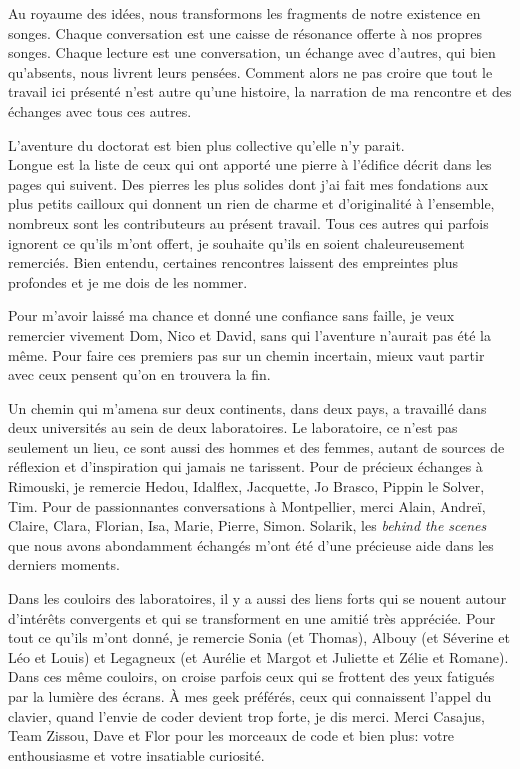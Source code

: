 Au royaume des idées, nous transformons les fragments de notre existence
en songes. Chaque conversation est une caisse de résonance offerte à nos
propres songes. Chaque lecture est une conversation, un échange avec
d'autres, qui bien qu'absents, nous livrent leurs pensées. Comment alors
ne pas croire que tout le travail ici présenté n'est autre qu'une
histoire, la narration de ma rencontre et des échanges avec tous ces
autres.

L'aventure du doctorat est bien plus collective qu'elle n'y parait.\\
Longue est la liste de ceux qui ont apporté une pierre à l'édifice
décrit dans les pages qui suivent. Des pierres les plus solides dont
j'ai fait mes fondations aux plus petits cailloux qui donnent un rien de
charme et d'originalité à l'ensemble, nombreux sont les contributeurs au
présent travail. Tous ces autres qui parfois ignorent ce qu'ils m'ont
offert, je souhaite qu'ils en soient chaleureusement remerciés. Bien
entendu, certaines rencontres laissent des empreintes plus profondes et
je me dois de les nommer.

Pour m'avoir laissé ma chance et donné une confiance sans faille, je
veux remercier vivement Dom, Nico et David, sans qui l'aventure n'aurait
pas été la même. Pour faire ces premiers pas sur un chemin incertain,
mieux vaut partir avec ceux pensent qu'on en trouvera la fin.

Un chemin qui m'amena sur deux continents, dans deux pays, a travaillé
dans deux universités au sein de deux laboratoires. Le laboratoire, ce
n'est pas seulement un lieu, ce sont aussi des hommes et des femmes,
autant de sources de réflexion et d'inspiration qui jamais ne tarissent.
Pour de précieux échanges à Rimouski, je remercie Hedou, Idalflex,
Jacquette, Jo Brasco, Pippin le Solver, Tim. Pour de passionnantes
conversations à Montpellier, merci Alain, Andreï, Claire, Clara,
Florian, Isa, Marie, Pierre, Simon. Solarik, les \emph{behind the
scenes} que nous avons abondamment échangés m'ont été d'une précieuse
aide dans les derniers moments.

Dans les couloirs des laboratoires, il y a aussi des liens forts qui se
nouent autour d'intérêts convergents et qui se transforment en une
amitié très appréciée. Pour tout ce qu'ils m'ont donné, je remercie
Sonia (et Thomas), Albouy (et Séverine et Léo et Louis) et Legagneux (et
Aurélie et Margot et Juliette et Zélie et Romane). Dans ces même
couloirs, on croise parfois ceux qui se frottent des yeux fatigués par
la lumière des écrans. À mes geek préférés, ceux qui connaissent l'appel
du clavier, quand l'envie de coder devient trop forte, je dis merci.
Merci Casajus, Team Zissou, Dave et Flor pour les morceaux de code et
bien plus: votre enthousiasme et votre insatiable curiosité.

